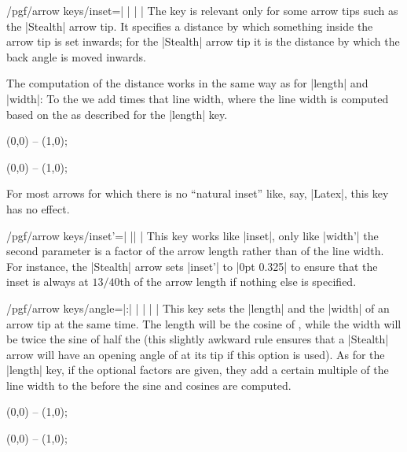 \begin{key}{/pgf/arrow keys/inset=| |%
        | |}
    The key is relevant only for some arrow tips such as the |Stealth| arrow
    tip. It specifies a distance by which something inside the arrow tip is set
    inwards; for the |Stealth| arrow tip it is the distance by which the back
    angle is moved inwards.

    The computation of the distance works in the same way as for |length| and
    |width|: To the  we add  times that
    line width, where the line width is computed based on the  as described for the |length| key.
\begin{codeexample}[]
\tikz \draw [arrows = {-Stealth[length=10pt, inset=5pt]}] (0,0) -- (1,0);
\end{codeexample}
\begin{codeexample}[]
\tikz \draw [arrows = {-Stealth[length=10pt, inset=2pt]}] (0,0) -- (1,0);
\end{codeexample}

    For most arrows for which there is no ``natural inset'' like, say, |Latex|,
    this key has no effect.
\end{key}

\begin{key}{/pgf/arrow keys/inset'=| || |}
    This key works like |inset|, only like |width'| the second parameter is a
    factor of the arrow length rather than of the line width. For instance, the
    |Stealth| arrow sets |inset'| to |0pt 0.325| to ensure that the inset is
    always at $13/40$th of the arrow length if nothing else is specified.
\end{key}

\begin{key}{/pgf/arrow keys/angle=|:|%
        | |%
        | |}
    This key sets the |length| and the |width| of an arrow tip at the same
    time. The length will be the cosine of , while the width will
    be twice the sine of half the  (this slightly awkward rule
    ensures that a |Stealth| arrow will have an opening angle of 
    at its tip if this option is used). As for the |length| key, if the
    optional factors are given, they add a certain multiple of the line width
    to the  before the sine and cosines are computed.
\begin{codeexample}[]
\tikz \draw [arrows = {-Stealth[inset=0pt, angle=90:10pt]}] (0,0) -- (1,0);
\end{codeexample}
\begin{codeexample}[]
\tikz \draw [arrows = {-Stealth[inset=0pt, angle=30:10pt]}] (0,0) -- (1,0);
\end{codeexample}
\end{key}

